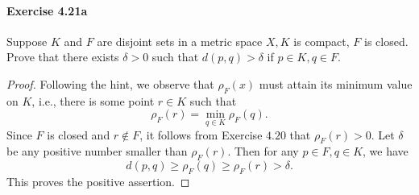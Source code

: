 \documentclass{article}
\theoremstyle{definition}
\begin{document}
\paragraph{Exercise 4.21a} Suppose $K$ and $F$ are disjoint sets in a metric space $X, K$ is compact, $F$ is closed. Prove that there exists $\delta>0$ such that $d(p, q)>\delta$ if $p \in K, q \in F$.
\begin{proof}
Following the hint, we observe that $\rho_F(x)$ must attain its minimum value on $K$, i.e., there is some point $r \in K$ such that
$$
\rho_F(r)=\min _{q \in K} \rho_F(q) .
$$
Since $F$ is closed and $r \notin F$, it follows from Exercise $4.20$ that $\rho_F(r)>0$. Let $\delta$ be any positive number smaller than $\rho_F(r)$. Then for any $p \in F, q \in K$, we have
$$
d(p, q) \geq \rho_F(q) \geq \rho_F(r)>\delta .
$$
This proves the positive assertion.
\end{proof}
\end{document}
